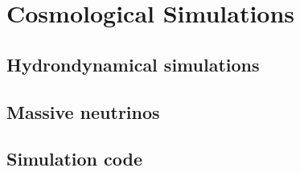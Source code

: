 \chapter{Cosmological Simulations}

\section{Hydrondynamical simulations}

\section{Massive neutrinos}

\section{Simulation code}